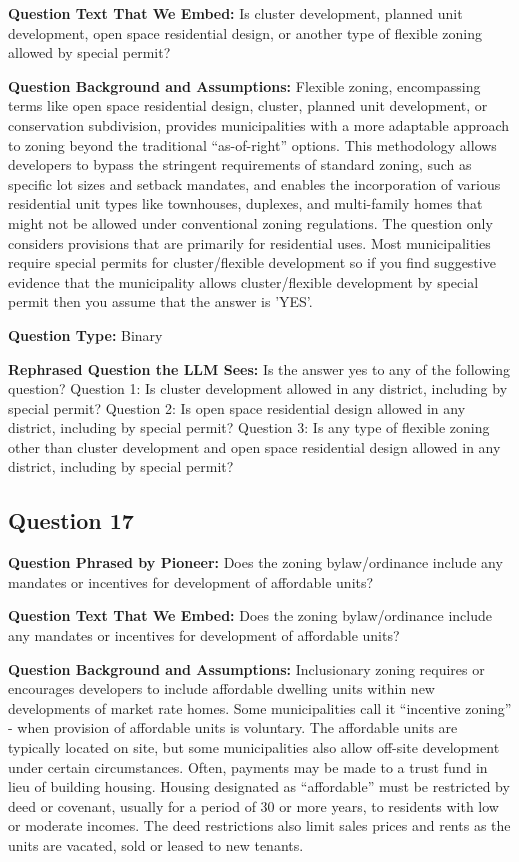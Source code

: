 \noindent\textbf{Question Text That We Embed:} Is cluster development, planned unit development, open space residential design, or another type of flexible zoning allowed by special permit?

\noindent\textbf{Question Background and Assumptions:} Flexible zoning, encompassing terms like open space residential design, cluster, planned unit development, or conservation subdivision, provides municipalities with a more adaptable approach to zoning beyond the traditional “as-of-right” options. This methodology allows developers to bypass the stringent requirements of standard zoning, such as specific lot sizes and setback mandates, and enables the incorporation of various residential unit types like townhouses, duplexes, and multi-family homes that might not be allowed under conventional zoning regulations. The question only considers provisions that are primarily for residential uses. Most municipalities require special permits for cluster/flexible development so if you find suggestive evidence that the municipality allows cluster/flexible development by special permit then you assume that the answer is 'YES'.

\noindent\textbf{Question Type:} Binary

\noindent\textbf{Rephrased Question the LLM Sees:} Is the answer yes to any of the following question?
Question 1: Is cluster development allowed in any district, including by special permit?
Question 2: Is open space residential design allowed in any district, including by special permit?
Question 3: Is any type of flexible zoning other than cluster development and open space residential design allowed in any district, including by special permit?

\vspace{1cm}
\subsection*{Question 17}
\noindent\textbf{Question Phrased by Pioneer:} Does the zoning bylaw/ordinance include any mandates or incentives for development of affordable units?

\noindent\textbf{Question Text That We Embed:} Does the zoning bylaw/ordinance include any mandates or incentives for development of affordable units?

\noindent\textbf{Question Background and Assumptions:} Inclusionary zoning requires or encourages developers to include affordable dwelling units within new developments of market rate homes. Some municipalities call it “incentive zoning” - when provision of affordable units is voluntary. The affordable units are typically located on site, but some municipalities also allow off-site development under certain circumstances. Often, payments may be made to a trust fund in lieu of building housing. Housing designated as “affordable” must be restricted by deed or covenant, usually for a period of 30 or more years, to residents with low or moderate incomes. The deed restrictions also limit sales prices and rents as the units are vacated, sold or leased to new tenants. 


